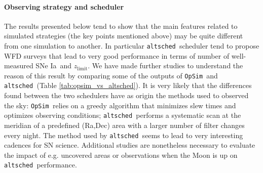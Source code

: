 \documentclass[a4paper,10pt]{article}
\newcommand{\zlimit}{$z_{\mathrm{limit}}$}
\newcommand{\opsim}{{\tt OpSim\ }}
\newcommand{\altsched}{{\tt altsched\ }}
\newcommand{\sne}{{SNe Ia}}
\begin{document}
\paragraph{Observing strategy and scheduler}

The results presented below tend to show that the main features related to simulated strategies (the key points mentioned above) may be quite different from one simulation to another. In particular \altsched scheduler tend to propose WFD surveys that lead to very good performance in terms of number of well-measured \sne~and \zlimit. We have made further studies to understand the reason of this result by comparing some of the outputs of \opsim and \altsched(Table \ref{tab:opsim_vs_altsched}). It is very likely that the differences found between the two schedulers have as origin the methods used to observed the sky: \opsim relies on a greedy algorithm that minimizes slew times and optimizes observing conditions; \altsched performs a systematic scan at the meridian of a predefined (Ra,Dec) area with a larger number of filter changes every night. The method used by \altsched seems to lead to very interesting cadences for SN science. Additional studies are nonetheless necessary to evaluate the impact of e.g. uncovered areas or observations when the Moon is up on \altsched performance.
\end{document}
